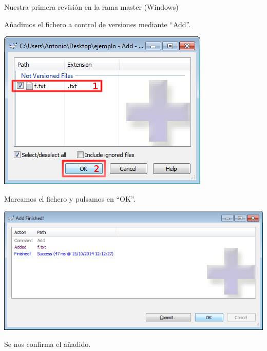 \documentclass[xcolor=svgnames]{beamer}
\begin{document}
\begin{frame}[t]{Nuestra primera revisión en la rama master (Windows)}
\begin{overprint}
\begin{center}
      \vfill

      Añadimos el fichero a control de versiones mediante ``Add''.
    \end{center}

    \begin{center}
      \includegraphics[width=\textwidth,height=.6\textheight,keepaspectratio]{tomas/primercommit-01-dlgadd}

      \vfill

      Marcamos el fichero y pulsamos en ``OK''.
    \end{center}

    \begin{center}
      \includegraphics[width=\textwidth,height=.6\textheight,keepaspectratio]{tomas/primercommit-02-success}

      \vfill

      Se nos confirma el añadido.
    \end{center}

    \begin{center}
      \vspace{.15\textheight}


\end{center}
\end{overprint}
\end{frame}
\end{document}
